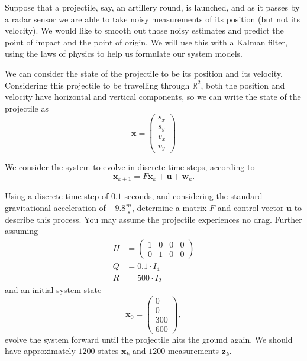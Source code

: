 

Suppose that a projectile, say, an artillery round, is launched, and as it passes by a radar sensor we are able to take noisy measurements of its position (but not its velocity). We would like to smooth out those noisy estimates and predict the point of impact and the point of origin. We will use this with a Kalman filter, using the laws of physics to help us formulate our system models.

We can consider the state of the projectile to be its position and its velocity. Considering this projectile to be travelling through $\mathbb{R}^{2}$, both the position and velocity have horizontal and vertical components, so we can write the state of the projectile as $$\mathbf{x} = \left( \begin{array}{c} s_{x} \\ s_{y} \\ v_{x} \\ v_{y} \end{array} \right)$$

We consider the system to evolve in discrete time steps, according to $$\mathbf{x}_{k+1} = F\mathbf{x}_{k} + \mathbf{u} + \mathbf{w}_{k}.$$

\begin{problem}
Using a discrete time step of $0.1$ seconds, and considering the standard gravitational acceleration of $-9.8 \frac{m}{s}$, determine a matrix $F$ and control vector $\mathbf{u}$ to describe this process. You may assume the projectile experiences no drag. Further assuming 
\begin{align*}
H & = \left( \begin{array}{cccc} 1 & 0 & 0 & 0 \\ 0 & 1 & 0 & 0 \end{array} \right) \\
Q & = 0.1 \cdot I_{4} \\
R & = 500 \cdot I_{2}
\end{align*}
and an initial system state $$\mathbf{x}_{0} = \left( \begin{array}{c} 0 \\ 0 \\ 300 \\ 600 \end{array} \right),$$ evolve the system forward until the projectile hits the ground again. We should have approximately $1200$ states $\mathbf{x}_{k}$ and $1200$ measurements $\mathbf{z}_{k}$.
\end{problem}

